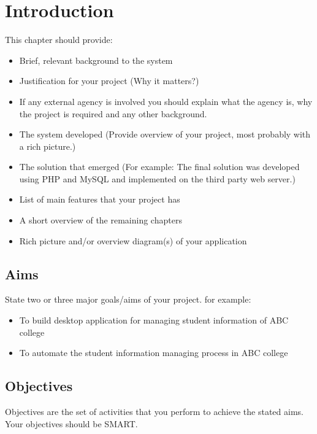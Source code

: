 \chapter{Introduction} %
\label{cha:introduction}

This chapter should provide:
\begin{itemize}
  \item Brief, relevant background to the system

  \item Justification for your project (Why it matters?)

  \item If any external agency is involved you should explain what the agency is, why the project is required and any other background.

  \item The system developed (Provide overview of your project, most probably with a rich picture.)
  \item The solution that emerged (For example: The final solution was developed using PHP and MySQL and implemented on the third party web server.)
  \item List of main features that your project has
  \item A short overview of the remaining chapters
  \item Rich picture and/or overview diagram(s) of your application
\end{itemize}

\section{Aims} %
\label{sec:aims}
State two or three major goals/aims of your project.
for example:\\
\begin{itemize}
  \item To build desktop application for managing student information of ABC college
  \item To automate the student information managing process in ABC college
\end{itemize}

\section{Objectives} %
\label{sec:objectives}

Objectives are the set of activities that you perform to achieve the stated aims. Your objectives should be SMART.

